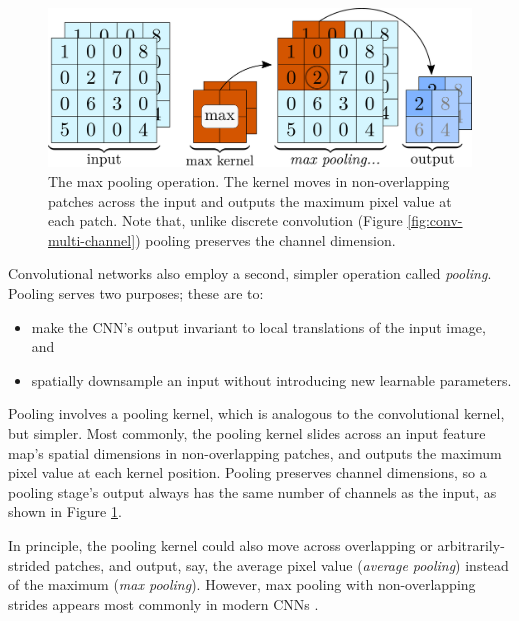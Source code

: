 \documentclass[11pt, a4paper]{article}
\DeclarePairedDelimiter\floor{\lfloor}{\rfloor}  %
\begin{document}
\begin{figure}[htb!]
    \centering
    \includegraphics[width=0.8\linewidth]{vector/pooling.pdf}
    \vspace{-2mm}
    \caption{The max pooling operation. The kernel moves in non-overlapping patches across the input and outputs the maximum pixel value at each patch. Note that, unlike discrete convolution (Figure \ref{fig:conv-multi-channel}) pooling preserves the channel dimension.}
    \label{fig:pooling}
\end{figure}
Convolutional networks also employ a second, simpler operation called \textit{pooling}. Pooling serves two purposes; these are to:
\begin{itemize}

    \item make the CNN's output invariant to local translations of the input image, and

    \item spatially downsample an input without introducing new learnable parameters. 

\end{itemize}
Pooling involves a pooling kernel, which is analogous to the convolutional kernel, but simpler. Most commonly, the pooling kernel slides across an input feature map's spatial dimensions in non-overlapping patches, and outputs the maximum pixel value at each kernel position. Pooling preserves channel dimensions, so a pooling stage's output always has the same number of channels as the input, as shown in Figure \ref{fig:pooling}. 

In principle, the pooling kernel could also move across overlapping or arbitrarily-strided patches, and output, say, the average pixel value (\textit{average pooling}) instead of the maximum (\textit{max pooling}). However, max pooling with non-overlapping strides appears most commonly in modern CNNs \cite{homl}. 


\end{document}
